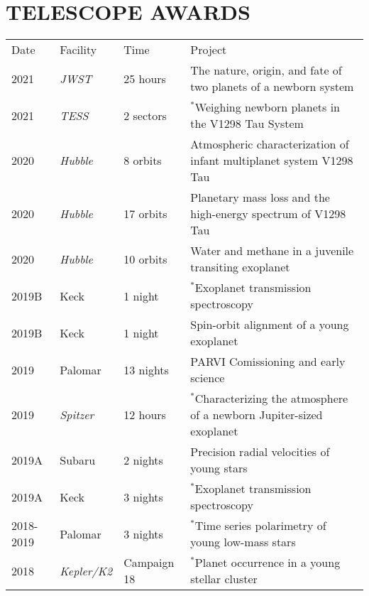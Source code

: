 \section{\large TELESCOPE AWARDS} 
\begin{tabular}{llll}
{\sc Date}  & {\sc Facility} & {\sc Time} &  {\sc Project}  \\
2021 & \textit{JWST} & 25 hours & The nature, origin, and fate of two planets of a newborn
system \\
2021 & \textit{TESS} & 2 sectors & $^*$Weighing newborn planets in the V1298 Tau System\\
2020 & \textit{Hubble} & 8 orbits & Atmospheric characterization of infant multiplanet system V1298 Tau\\ %
2020 & \textit{Hubble} & 17 orbits & Planetary mass loss and the high-energy spectrum of V1298 Tau\\%
2020 & \textit{Hubble} & 10 orbits & Water and methane in a juvenile transiting exoplanet\\%
2019B & Keck & 1 night & $^*$Exoplanet transmission spectroscopy\\%
2019B & Keck & 1 night & Spin-orbit alignment of a young exoplanet\\%
2019 & Palomar & 13 nights & PARVI Comissioning and early science\\%
2019 & \textit{Spitzer} & 12 hours & $^*$Characterizing the atmosphere of a newborn Jupiter-sized exoplanet\\%
2019A & Subaru & 2 nights & Precision radial velocities of young stars\\%
2019A & Keck & 3 nights & $^*$Exoplanet transmission spectroscopy\\%
2018-2019 & Palomar & 3 nights & $^*$Time series polarimetry of young low-mass stars\\%
2018 & \textit{Kepler/K2} & Campaign 18 &  $^*$Planet occurrence in a young stellar cluster\\%

\end{tabular}
